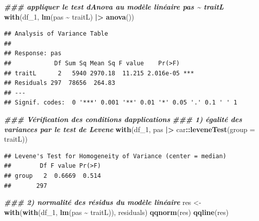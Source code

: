 \documentclass[
]{book}
\newenvironment{Shaded}{\begin{snugshade}}{\end{snugshade}}
\newcommand{\AttributeTok}[1]{\textcolor[rgb]{0.13,0.29,0.53}{#1}}
\newcommand{\DocumentationTok}[1]{\textcolor[rgb]{0.56,0.35,0.01}{\textbf{\textit{#1}}}}
\newcommand{\FunctionTok}[1]{\textcolor[rgb]{0.13,0.29,0.53}{\textbf{#1}}}
\newcommand{\NormalTok}[1]{#1}
\newcommand{\OtherTok}[1]{\textcolor[rgb]{0.56,0.35,0.01}{#1}}
\newcommand{\SpecialCharTok}[1]{\textcolor[rgb]{0.81,0.36,0.00}{\textbf{#1}}}
\begin{document}
\begin{Shaded}
\begin{Highlighting}[]
\DocumentationTok{\#\#\# appliquer le test d\textquotesingle{}Anova au modèle linéaire pas \textasciitilde{} traitL}
\FunctionTok{with}\NormalTok{(df\_1,}
     \FunctionTok{lm}\NormalTok{(pas }\SpecialCharTok{\textasciitilde{}}\NormalTok{ traitL) }\SpecialCharTok{|\textgreater{}}
       \FunctionTok{anova}\NormalTok{())}
\end{Highlighting}
\end{Shaded}

\begin{verbatim}
## Analysis of Variance Table
## 
## Response: pas
##            Df Sum Sq Mean Sq F value    Pr(>F)    
## traitL      2   5940 2970.18  11.215 2.016e-05 ***
## Residuals 297  78656  264.83                      
## ---
## Signif. codes:  0 '***' 0.001 '**' 0.01 '*' 0.05 '.' 0.1 ' ' 1
\end{verbatim}

\begin{Shaded}
\begin{Highlighting}[]
\DocumentationTok{\#\#\# Vérification des conditions d\textquotesingle{}applications}
\DocumentationTok{\#\#\# 1) égalité des variances par le test de Levene}
\FunctionTok{with}\NormalTok{(df\_1,}
\NormalTok{     pas }\SpecialCharTok{|\textgreater{}}\NormalTok{ car}\SpecialCharTok{::}\FunctionTok{leveneTest}\NormalTok{(}\AttributeTok{group =}\NormalTok{ traitL))}
\end{Highlighting}
\end{Shaded}

\begin{verbatim}
## Levene's Test for Homogeneity of Variance (center = median)
##        Df F value Pr(>F)
## group   2  0.6669  0.514
##       297
\end{verbatim}

\begin{Shaded}
\begin{Highlighting}[]
\DocumentationTok{\#\#\# 2) normalité des résidus du modèle linéaire}
\NormalTok{res }\OtherTok{\textless{}{-}} \FunctionTok{with}\NormalTok{(}\FunctionTok{with}\NormalTok{(df\_1, }\FunctionTok{lm}\NormalTok{(pas }\SpecialCharTok{\textasciitilde{}}\NormalTok{ traitL)),}
\NormalTok{            residuals)}
\FunctionTok{qqnorm}\NormalTok{(res)}
\FunctionTok{qqline}\NormalTok{(res)}
\end{Highlighting}
\end{Shaded}
\end{document}
